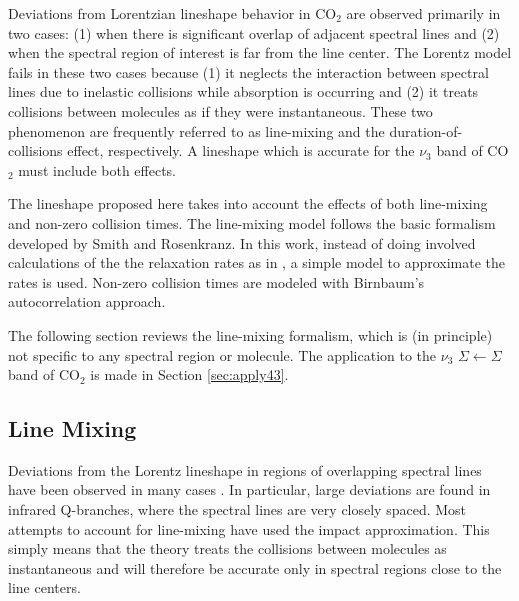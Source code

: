 \documentclass[11pt]{article}
\begin{document}
Deviations from Lorentzian lineshape behavior in CO$_2$ are observed 
primarily in two
cases: (1) when there is significant overlap of adjacent spectral lines 
and (2) when the spectral region of interest is far from the line center.
The Lorentz model fails in these two cases because (1) it neglects the
interaction between spectral lines due to inelastic collisions while
absorption is occurring and (2) it treats collisions between 
molecules as if they were instantaneous.  These two phenomenon are
frequently referred to as line-mixing and the duration-of-collisions
effect, respectively.  A lineshape which is accurate for the $\nu_3$ band 
of CO$_2$ must include both effects.

The lineshape proposed here takes into account the effects of both 
line-mixing and non-zero collision times.  The line-mixing 
model follows the basic formalism developed by Smith\cite{smi:81} 
and Rosenkranz\cite{ros:88}.  In this work, instead of doing involved 
calculations of the the relaxation rates as in 
\cite{cou:86,boi:89,bon:91}, a simple model to approximate the
rates is used.  Non-zero collision times are modeled with Birnbaum's 
autocorrelation approach\cite{bir:82}. 

The following section reviews the line-mixing formalism, which is (in
principle) not specific to any spectral region or molecule.  The
application to the $\nu_3$ $\Sigma\leftarrow\Sigma$ band of CO$_2$ is made
in Section \ref{sec:apply43}.  

\subsection{Line Mixing}\label{sec:lm_general}
Deviations from the Lorentz lineshape in regions of overlapping spectral
lines have been observed in many cases
\cite{bar:58,ben:66,fan:58*1,kol:58,gor:67} .  In particular, large
deviations are found in infrared Q-branches, where the spectral lines are
very closely spaced.  Most attempts \cite{bar:58,fan:58*1,kol:58}
to account for line-mixing have used the
impact approximation.  This simply means that the theory
treats the collisions between molecules as instantaneous and will therefore
be accurate only in spectral regions close to the line centers.  
\end{document}
